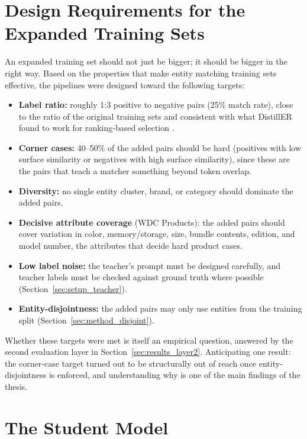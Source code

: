 \documentclass[a4paper,oneside,bibliography=totoc]{scrbook}
\begin{document}
\section{Design Requirements for the Expanded Training Sets}
\label{sec:method_requirements}

An expanded training set should not just be bigger; it should be bigger in the right way. Based on the properties that make entity matching training sets effective, the pipelines were designed toward the following targets:

\begin{itemize}
\item \textbf{Label ratio:} roughly 1:3 positive to negative pairs (25\% match rate), close to the ratio of the original training sets and consistent with what DistillER found to work for ranking-based selection \cite{zeakis2026distiller}.
\item \textbf{Corner cases:} 40--50\% of the added pairs should be hard (positives with low surface similarity or negatives with high surface similarity), since these are the pairs that teach a matcher something beyond token overlap.
\item \textbf{Diversity:} no single entity cluster, brand, or category should dominate the added pairs.
\item \textbf{Decisive attribute coverage} (WDC Products): the added pairs should cover variation in color, memory/storage, size, bundle contents, edition, and model number, the attributes that decide hard product cases.
\item \textbf{Low label noise:} the teacher's prompt must be designed carefully, and teacher labels must be checked against ground truth where possible (Section~\ref{sec:setup_teacher}).
\item \textbf{Entity-disjointness:} the added pairs may only use entities from the training split (Section~\ref{sec:method_disjoint}).
\end{itemize}

Whether these targets were met is itself an empirical question, answered by the second evaluation layer in Section~\ref{sec:results_layer2}. Anticipating one result: the corner-case target turned out to be structurally out of reach once entity-disjointness is enforced, and understanding why is one of the main findings of the thesis.

\section{The Student Model}
\label{sec:method_student}
\end{document}
